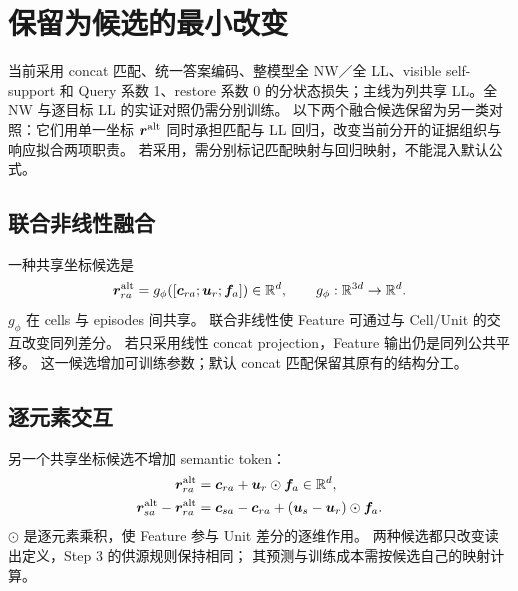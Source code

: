 \documentclass[11pt,UTF8,fontset=fandol]{ctexart}
\numberwithin{equation}{section}
\theoremstyle{definition}
\newcommand{\R}{\mathbb R}
\begin{document}
\section{保留为候选的最小改变}
\label{sec:alternatives}

当前采用 concat 匹配、统一答案编码、整模型全 NW／全 LL、visible self-support
和 Query 系数 1、restore 系数 0 的分状态损失；主线为列共享 LL。全 NW 与逐目标 LL 的实证对照仍需分别训练。
以下两个融合候选保留为另一类对照：它们用单一坐标 $\bm r^{\rm alt}$
同时承担匹配与 LL 回归，改变当前分开的证据组织与响应拟合两项职责。
若采用，需分别标记匹配映射与回归映射，不能混入默认公式。

\subsection{联合非线性融合}
一种共享坐标候选是
\begin{equation}
 \bm r^{\rm alt}_{ra}=g_\phi\!\left(
          [\bm c_{ra};\bm u_r;\bm f_a]\right)\in\R^d,
 \qquad g_\phi:\R^{3d}\to\R^d.
 \label{eq:alt:joint-fusion}
\end{equation}
$g_\phi$ 在 cells 与 episodes 间共享。
联合非线性使 Feature 可通过与 Cell/Unit 的交互改变同列差分。
若只采用线性 concat projection，Feature 输出仍是同列公共平移。
这一候选增加可训练参数；默认 concat 匹配保留其原有的结构分工。

\subsection{逐元素交互}
另一个共享坐标候选不增加 semantic token：
\begin{equation}
\begin{aligned}
 \bm r^{\rm alt}_{ra}&=\bm c_{ra}+\bm u_r\odot\bm f_a\in\R^d,\\
 \bm r^{\rm alt}_{sa}-\bm r^{\rm alt}_{ra}
 &=\bm c_{sa}-\bm c_{ra}+(\bm u_s-\bm u_r)\odot\bm f_a.
\end{aligned}
 \label{eq:alt:elementwise-interaction}
\end{equation}
$\odot$ 是逐元素乘积，使 Feature 参与 Unit 差分的逐维作用。
两种候选都只改变读出定义，Step 3 的供源规则保持相同；
其预测与训练成本需按候选自己的映射计算。
\end{document}
